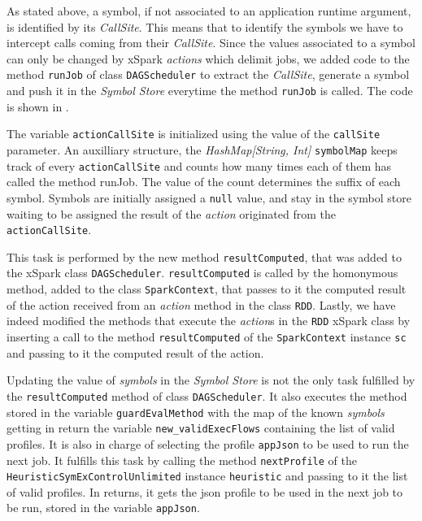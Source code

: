 As stated above, a symbol, if not associated to an application runtime argument,  is identified by its \textit{CallSite}. This means that to identify the symbols we have to intercept calls coming from their  \textit{CallSite}. Since the values associated to a symbol can only be changed by xSpark \textit{actions} which delimit jobs, we added code to the method \texttt{runJob} of class \texttt{DAGScheduler} to extract the \textit{CallSite}, generate a symbol and push it in the \textit{Symbol Store} everytime the method \texttt{runJob} is called. The code is shown in . 

The variable \texttt{actionCallSite} is initialized using the value of the \texttt{callSite} parameter.
An auxilliary structure, the \textit{HashMap[String, Int]} \texttt{symbolMap} keeps track of every \texttt{actionCallSite} and counts how many times each of them has called the method runJob. The value of the count determines the suffix of each symbol. Symbols are initially assigned a \texttt{null} value, and stay in the symbol store waiting to be assigned the result of the \textit{action} originated from the \texttt{actionCallSite}. 

This task is performed by the new method \texttt{resultComputed}, that was added to the xSpark class \texttt{DAGScheduler}. \texttt{resultComputed} is called by the homonymous method, added to the class \texttt{SparkContext}, that passes to it the computed result of the action received from an \textit{action} method in the class \texttt{RDD}. 
Lastly, we have indeed modified the methods that execute the \textit{action}s in the \texttt{RDD} xSpark class by inserting a call to the method \texttt{resultComputed} of the \texttt{SparkContext} instance \texttt{sc} and passing to it the computed result of the action. 

Updating the value of \textit{symbols} in the \textit{Symbol Store} is not the only task fulfilled by the \texttt{resultComputed} method of class \texttt{DAGScheduler}. It also executes the method stored in the variable \texttt{guardEvalMethod} with the map of the known \textit{symbols} getting in return the variable \texttt{new\_validExecFlows} containing the list of valid profiles. It is also in charge of selecting the profile \texttt{appJson} to be used to run the next job. It fulfills this task by calling the method \texttt{nextProfile} of the \texttt{HeuristicSymExControlUnlimited} instance \texttt{heuristic} and passing to it the list of valid profiles. In returns, it gets the json profile to be used in the next job to be run, stored in the variable \texttt{appJson}. 

